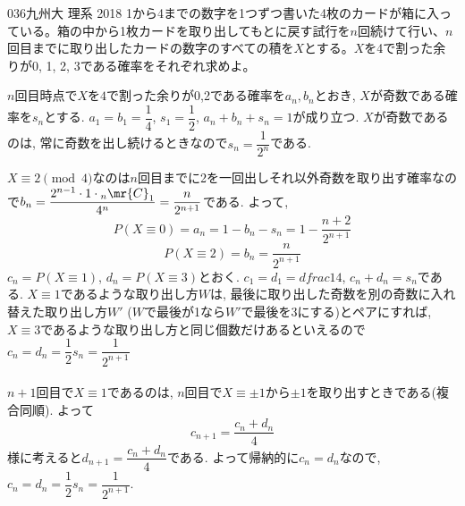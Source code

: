 \begin{prob}{036}{}{九州大 理系 2018}
 1から4までの数字を1つずつ書いた4枚のカードが箱に入っている。箱の中から1枚カードを取り出してもとに戻す試行を$n$回続けて行い、$n$回目までに取り出したカードの数字のすべての積を$X$とする。$X$を4で割った余りが0, 1, 2, 3である確率をそれぞれ求めよ。
\end{prob}

$n$回目時点で$X$を$4$で割った余りが0,2である確率を$a_n,b_n$とおき, $X$が奇数である確率を$s_n$とする. $a_1 = b_1 = \dfrac{1}{4}$, $s_1 = \dfrac{1}{2}$, $a_n+b_n+s_n = 1$が成り立つ. $X$が奇数であるのは, 常に奇数を出し続けるときなので$s_n = \dfrac{1}{2^n}$である. \par 
$X\equiv 2\pmod{4}$なのは$n$回目までに2を一回出しそれ以外奇数を取り出す確率なので$b_n = \dfrac{2^{n-1}\cdot 1\cdot {}_n\mr{C}_1}{4^n} = \dfrac{n}{2^{n+1}} $である. よって, 
\[P(X\equiv 0) = a_n = 1-b_n - s_n = 1 - \dfrac{n+2}{2^{n+1}}\]
\[P(X\equiv 2) = b_n = \dfrac{n}{2^{n+1}}\]
$c_n = P(X\equiv 1)$, $d_n = P(X\equiv 3)$とおく. $c_1=d_1 = dfrac{1}{4}$, $c_n + d_n = s_n$である. $X\equiv 1$であるような取り出し方$W$は, 最後に取り出した奇数を別の奇数に入れ替えた取り出し方$W'$ ($W$で最後が1なら$W'$で最後を3にする)とペアにすれば, $X\equiv 3$であるような取り出し方と同じ個数だけあるといえるので$c_n = d_n = \dfrac{1}{2}s_n = \dfrac{1}{2^{n+1}}$\\
\\
 $n+1$回目で$X\equiv 1$であるのは, $n$回目で$X\equiv \pm 1$から$\pm 1$を取り出すときである(複合同順). よって
\[c_{n+1} = \dfrac{c_n+d_n}{4}\]
様に考えると$d_{n+1} = \dfrac{c_n+d_n}{4}$である. よって帰納的に$c_n  = d_n$なので, $c_n = d_n = \dfrac{1}{2}s_n = \dfrac{1}{2^{n+1}}$. 
